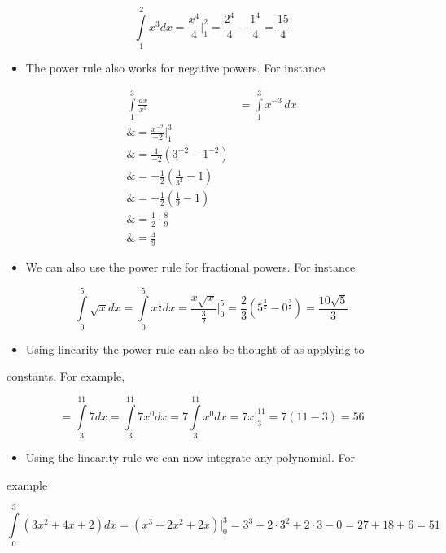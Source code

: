 $$\int\limits _1^2x^3dx=\frac{x^4}{4}\Bigg| _1^2=\frac{2^4}{4}-\frac{1^4}{4}=\frac{15}{4}$$



\begin{itemize}
    \item The power rule also works for negative powers. For instance
\end{itemize}

\begin{align}
\int\limits _1^3\frac{dx}{x^3} &= \int\limits _1^3 x^{-3}\,dx \\\&= \frac{x^{-2}}{-2}\Bigg| _1^3 \\\&= \frac{1}{-2}\left(3^{-2} - 1^{-2}\right) \\\&= -\frac{1}{2}\left(\frac{1}{3^2} - 1\right) \\\&= -\frac{1}{2}\left(\frac{1}{9} - 1\right) \\\&= \frac{1}{2} \cdot \frac{8}{9} \\\&= \frac{4}{9}
\end{align}





\begin{itemize}
    \item We can also use the power rule for fractional powers. For instance
\end{itemize}

$$\int\limits _0^5\sqrt{x}dx=\int\limits _0^5x^\frac12dx=\frac{x\sqrt{x}}{\frac32}\Bigg| _0^5=\frac23\left(5^\frac32-0^\frac32\right)=\frac{10\sqrt5}{3}$$



\begin{itemize}
    \item Using linearity the power rule can also be thought of as applying to
\end{itemize}
    constants. For example,



$$=\int\limits _3^{11}7dx=\int\limits _3^{11}7x^0dx=7\int\limits_3^{11}x^0dx=7x\Bigg| _3^{11}=7(11-3)=56$$



\begin{itemize}
    \item Using the linearity rule we can now integrate any polynomial. For
\end{itemize}
    example



$$\int\limits_0^3(3x^2+4x+2)dx=(x^3+2x^2+2x)\Bigg| _0^3=3^3+2\cdot 3^2+2\cdot3-0=27+18+6=51$$



